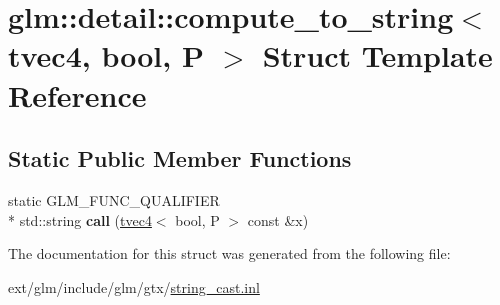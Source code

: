 \hypertarget{structglm_1_1detail_1_1compute__to__string_3_01tvec4_00_01bool_00_01_p_01_4}{\section{glm\-:\-:detail\-:\-:compute\-\_\-to\-\_\-string$<$ tvec4, bool, P $>$ Struct Template Reference}
\label{structglm_1_1detail_1_1compute__to__string_3_01tvec4_00_01bool_00_01_p_01_4}
}
\subsection*{Static Public Member Functions}
\begin{DoxyCompactItemize}
\item 
\hypertarget{structglm_1_1detail_1_1compute__to__string_3_01tvec4_00_01bool_00_01_p_01_4_a22a41058af4ceb92f6c12ad968a4205d}{static G\-L\-M\-\_\-\-F\-U\-N\-C\-\_\-\-Q\-U\-A\-L\-I\-F\-I\-E\-R \\*
std\-::string {\bfseries call} (\hyperlink{structglm_1_1tvec4}{tvec4}$<$ bool, P $>$ const \&x)}\label{structglm_1_1detail_1_1compute__to__string_3_01tvec4_00_01bool_00_01_p_01_4_a22a41058af4ceb92f6c12ad968a4205d}

\end{DoxyCompactItemize}


The documentation for this struct was generated from the following file\-:\begin{DoxyCompactItemize}
\item 
ext/glm/include/glm/gtx/\hyperlink{string__cast_8inl}{string\-\_\-cast.\-inl}\end{DoxyCompactItemize}
